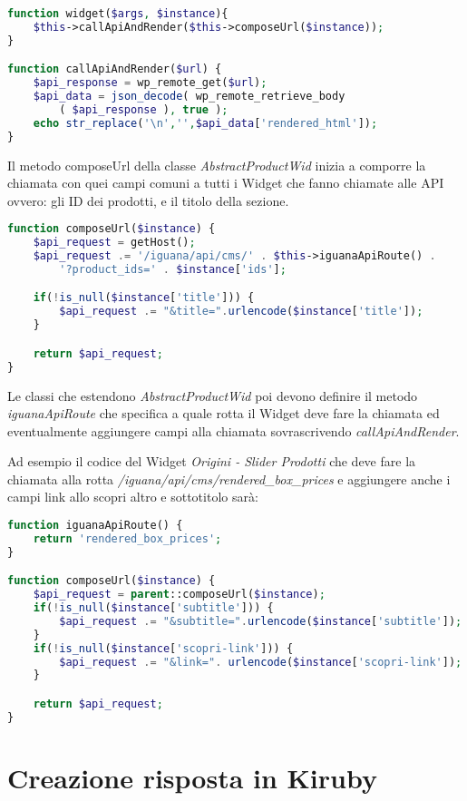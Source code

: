 \begin{lstlisting}[style=customphp, language=Php,caption={I metodi widget e \emph{callApiAndRender} di \emph{AbstractProductWid}}] 
function widget($args, $instance){
	$this->callApiAndRender($this->composeUrl($instance));
}

function callApiAndRender($url) {
	$api_response = wp_remote_get($url);
	$api_data = json_decode( wp_remote_retrieve_body
		( $api_response ), true );
	echo str_replace('\n','',$api_data['rendered_html']);
}
\end{lstlisting}

Il metodo composeUrl della classe \emph{AbstractProductWid} inizia a comporre la chiamata con quei campi
comuni a tutti i Widget che fanno chiamate alle API ovvero: gli ID dei prodotti, e il titolo della sezione.

\begin{lstlisting}[style=customphp, language=Php,caption={Il metodo \emph{composeUrl} di \emph{AbstractProductWid}}] 
function composeUrl($instance) {
    $api_request = getHost();
    $api_request .= '/iguana/api/cms/' . $this->iguanaApiRoute() . 
    	'?product_ids=' . $instance['ids'];

    if(!is_null($instance['title'])) {
        $api_request .= "&title=".urlencode($instance['title']);
    }

    return $api_request;
}

\end{lstlisting}

Le classi che estendono \emph{AbstractProductWid} poi devono definire il metodo \emph{iguanaApiRoute} che specifica
a quale rotta il Widget deve fare la chiamata ed eventualmente aggiungere campi alla chiamata sovrascrivendo \emph{callApiAndRender}.

Ad esempio il codice del Widget \emph{Origini - Slider Prodotti} che deve fare la chiamata alla rotta \emph{/iguana/api/cms/rendered\_box\_prices} e aggiungere  anche i campi link allo scopri altro e sottotitolo sarà:

\begin{lstlisting}[style=customphp, language=Php,caption={I metodi widget \emph{composeUrl} e \emph{iguanaApiRoute} di \emph{ProductsWidget}}] 
function iguanaApiRoute() {
    return 'rendered_box_prices';
}

function composeUrl($instance) {
    $api_request = parent::composeUrl($instance);
    if(!is_null($instance['subtitle'])) {
        $api_request .= "&subtitle=".urlencode($instance['subtitle']);
    }
    if(!is_null($instance['scopri-link'])) {
        $api_request .= "&link=". urlencode($instance['scopri-link']);
    }

    return $api_request;
}
\end{lstlisting}

\section{Creazione risposta in Kiruby}